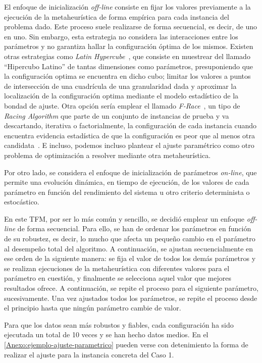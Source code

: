 El enfoque de inicialización \textit{off-line} consiste en fijar los valores previamente a la ejecución de la metaheurística de forma empírica para cada instancia del problema dado. Este proceso suele realizarse de forma secuencial, es decir, de uno en uno. Sin embargo, esta estrategia no considera las interacciones entre los parámetros y no garantiza hallar la configuración óptima de los mismos. Existen otras estrategias como \textit{Latin Hypercube}~\cite{latin-hypercube}, que consiste en muestrear del llamado ``Hipercubo Latino'' de tantas dimensiones como parámetros, presuponiendo que la configuración optima se encuentra en dicho cubo; limitar los valores a puntos de intersección de una cuadrícula de una granularidad dada y aproximar la localización de la configuración optima mediante el modelo estadístico de la bondad de ajuste.
Otra opción sería emplear el llamado \textit{F-Race}~\cite{F-Race}, un tipo de \textit{Racing Algorithm} que parte de un conjunto de instancias de prueba y va descartando, iterativa o factorialmente, la configuración de cada instancia cuando encuentra evidencia estadística de que la configuración es peor que al menos otra candidata~\cite{F-Race-2}. 
E incluso, podemos incluso plantear el ajuste paramétrico como otro problema de optimización a resolver mediante otra metaheurística.

Por otro lado, se considera el enfoque de inicialización de parámetros \textit{on-line}, que permite una evolución dinámica, en tiempo de ejecución, de los valores de cada parámetro en función del rendimiento del sistema u otro criterio determinista o estocástico.

En este TFM, por ser lo más común y sencillo, se decidió emplear un enfoque \textit{off-line} de forma secuencial. Para ello, se han de ordenar los parámetros en función de su robustez, es decir, lo mucho que afecta un pequeño cambio en el parámetro al desempeño total del algoritmo. A continuación, se ajustan secuencialmente en ese orden de la siguiente manera: se fija el valor de todos los demás parámetros y se realizan ejecuciones de la metaheurística con diferentes valores para el parámetro en cuestión, y finalmente se selecciona aquel valor que mejores resultados ofrece. A continuación, se repite el proceso para el siguiente parámetro, sucesivamente.
Una vez ajustados todos los parámetros, se repite el proceso desde el principio hasta que ningún parámetro cambie de valor.

Para que los datos sean más robustos y fiables, cada configuración ha sido ejecutada un total de 10 veces y se han hecho datos medios. En el \autoref{Anexo:ejemplo-ajuste-parametrico} pueden verse con detenimiento la forma de realizar el ajuste para la instancia concreta del Caso 1.

